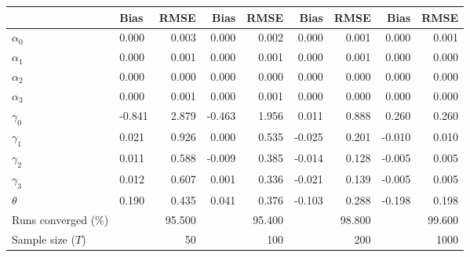 
\begin{tabular}[t]{llrrrrrrr}
\toprule
  & Bias & RMSE & Bias & RMSE & Bias & RMSE & Bias & RMSE\\
\midrule
$\alpha_{0}$ & 0.000 & 0.003 & 0.000 & 0.002 & 0.000 & 0.001 & 0.000 & 0.001\\
$\alpha_{1}$ & 0.000 & 0.001 & 0.000 & 0.001 & 0.000 & 0.001 & 0.000 & 0.000\\
$\alpha_{2}$ & 0.000 & 0.000 & 0.000 & 0.000 & 0.000 & 0.000 & 0.000 & 0.000\\
$\alpha_{3}$ & 0.000 & 0.001 & 0.000 & 0.001 & 0.000 & 0.000 & 0.000 & 0.000\\
$\gamma_{0}$ & -0.841 & 2.879 & -0.463 & 1.956 & 0.011 & 0.888 & 0.260 & 0.260\\
$\gamma_{1}$ & 0.021 & 0.926 & 0.000 & 0.535 & -0.025 & 0.201 & -0.010 & 0.010\\
$\gamma_{2}$ & 0.011 & 0.588 & -0.009 & 0.385 & -0.014 & 0.128 & -0.005 & 0.005\\
$\gamma_{3}$ & 0.012 & 0.607 & 0.001 & 0.336 & -0.021 & 0.139 & -0.005 & 0.005\\
$\theta$ & 0.190 & 0.435 & 0.041 & 0.376 & -0.103 & 0.288 & -0.198 & 0.198\\
Runs converged (\%) &  & 95.500 &  & 95.400 &  & 98.800 &  & 99.600\\
Sample size ($T$) &  & 50 &  & 100 &  & 200 &  & 1000\\
\bottomrule
\end{tabular}
